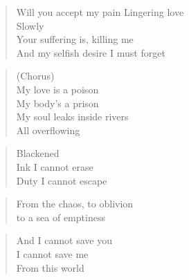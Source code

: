 

\begin{minipage}{0.6\textwidth}
    \begin{verse}
    Will you accept my pain
    Lingering love \\
    Slowly \\
    Your suffering is, killing me \\
    And my selfish desire I must forget
    \end{verse}

    \begin{verse}
    (Chorus) \\
    My love is a poison \\
    My body's a prison \\
    My soul leaks inside rivers \\
    All overflowing
    \end{verse}

    \begin{verse}
    Blackened \\
    Ink I cannot erase \\
    Duty I cannot escape
    \end{verse}

    \begin{verse}
    From the chaos, to oblivion \\
    to a sea of emptiness
    \end{verse}

    \begin{verse}
    And I cannot save you \\
    I cannot save me \\
    From this world
    \end{verse}

\end{minipage}
\clearpage
